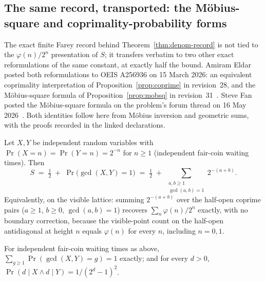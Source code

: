 \subsection{The same record, transported: the M\"obius-square and coprimality-probability forms}
\label{ssec:coprime}

The exact finite Farey record behind Theorem~\ref{thm:denom-record} is not tied to
the $\varphi(n)/2^n$ presentation of $S$; it transfers verbatim to two other
exact reformulations of the same constant, at exactly half the bound.
Amiram Eldar posted both reformulations to OEIS A256936 on 15 March 2026: an
equivalent coprimality interpretation of Proposition~\ref{prop:coprime} in
revision~28, and the M\"obius-square formula of Proposition~\ref{prop:mobsq}
in revision~31~\cite{eldar2026oeis}.  Steve Fan posted the M\"obius-square
formula on the problem's forum thread on 16 May 2026~\cite{fan2026totient}.
Both identities follow here from M\"obius inversion and geometric sums, with
the proofs recorded in the linked declarations.

\begin{prop}
\label{prop:coprime}
Let $X,Y$ be independent random variables with $\Pr(X=n)=\Pr(Y=n)=2^{-n}$
for $n \ge 1$ (independent fair-coin waiting times). Then
\[
S \;=\; \tfrac12 \;+\; \Pr\bigl(\gcd(X,Y)=1\bigr)
\;=\; \tfrac12 \;+\; \sum_{\substack{a,b\ge 1\\ \gcd(a,b)=1}} 2^{-(a+b)}.
\]
Equivalently, on the visible lattice: summing $2^{-(a+b)}$ over the half-open
coprime pairs ($a\ge1$, $b\ge0$, $\gcd(a,b)=1$) recovers $\sum_n \varphi(n)/2^n$
exactly, with no boundary correction, because the visible-point count on the
half-open antidiagonal at height $n$ equals $\varphi(n)$ for every $n$,
including $n=0,1$.
  
\end{prop}

\begin{prop}
\label{prop:gcdlayer}
For independent fair-coin waiting times as above, $\sum_{g\ge1}\Pr(\gcd(X,Y)=g)=1$
exactly; and for every $d>0$, $\Pr(d\mid X \wedge d\mid Y) = 1/(2^d-1)^2$.
  
\end{prop}

